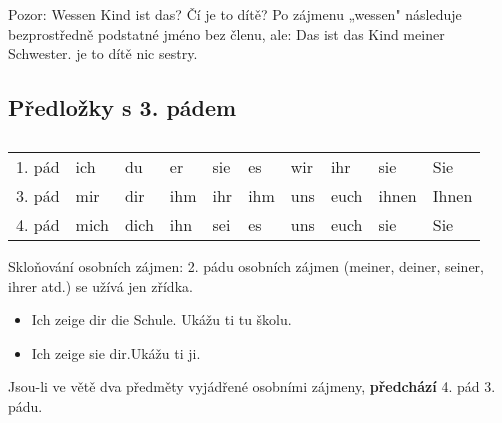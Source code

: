       Pozor: Wessen Kind ist das? Čí je to dítě? Po zájmenu „wessen" následuje bezprostředně podstatné 
      jméno bez členu, ale: Das ist das Kind meiner Schwester. je to dítě nic sestry.
      
    \subsection*{Předložky s 3. pádem}
      \begin{table}[ht!]   %
        \centering
        \begin{tabular}{l|lllllllll}
          \hline
            1. pád & ich  & du   & er  & sie & es  & wir & ihr  & sie   & Sie   \\
            3. pád & mir  & dir  & ihm & ihr & ihm & uns & euch & ihnen & Ihnen \\
            4. pád & mich & dich & ihn & sei & es  & uns & euch & sie   & Sie   \\
          \hline
        \end{tabular}
        \caption*{ }
      \end{table}
      Skloňování osobních zájmen: 2. pádu osobních zájmen (meiner, deiner, seiner, ihrer atd.) se 
      užívá jen zřídka.
      \begin{itemize}[noitemsep]
        \item Ich zeige dir die Schule. Ukážu ti tu školu.
        \item Ich zeige sie dir.Ukážu ti ji.
      \end{itemize}     
      Jsou-li ve větě dva předměty vyjádřené osobními zájmeny, \textbf{předchází} 4. pád 3. pádu.
  
